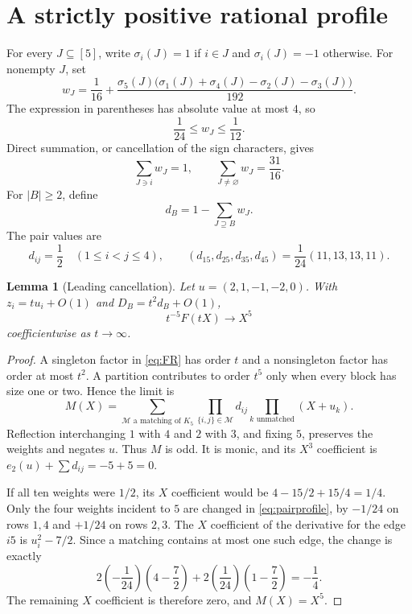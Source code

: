 \documentclass[11pt,a4paper]{article}
\newtheorem{lemma}[theorem]{Lemma}
\theoremstyle{definition}
\begin{document}
\section{A strictly positive rational profile}\label{sec:profile}

For every $J\subseteq[5]$, write $\sigma_i(J)=1$ if $i\in J$ and
$\sigma_i(J)=-1$ otherwise. For nonempty $J$, set
\begin{equation}\label{eq:weights}
 w_J=\frac1{16}
 +\frac{\sigma_5(J)\bigl(\sigma_1(J)+\sigma_4(J)
                         -\sigma_2(J)-\sigma_3(J)\bigr)}{192}.
\end{equation}
The expression in parentheses has absolute value at most $4$, so
\begin{equation}\label{eq:wpositive}
 \frac1{24}\le w_J\le\frac1{12}.
\end{equation}
Direct summation, or cancellation of the sign characters, gives
\begin{equation}\label{eq:wmoments}
 \sum_{J\ni i}w_J=1,\qquad
 \sum_{J\ne\varnothing}w_J=\frac{31}{16}.
\end{equation}
For $|B|\ge2$, define
\begin{equation}\label{eq:dprofile}
 d_B=1-\sum_{J\supseteq B}w_J.
\end{equation}
The pair values are
\begin{equation}\label{eq:pairprofile}
 d_{ij}=\frac12\quad(1\le i<j\le4),\qquad
 (d_{15},d_{25},d_{35},d_{45})
 =\frac1{24}(11,13,13,11).
\end{equation}

\begin{lemma}[Leading cancellation]\label{lem:leading}
Let $u=(2,1,-1,-2,0)$.
With $z_i=tu_i+O(1)$ and $D_B=t^2d_B+O(1)$,
\begin{equation}\label{eq:leading}
 t^{-5}F(tX)\longrightarrow X^5
\end{equation}
coefficientwise as $t\longrightarrow\infty$.
\end{lemma}
\begin{proof}
A singleton factor in \eqref{eq:FR} has order $t$ and a nonsingleton
factor has order at most $t^2$. A partition contributes to order $t^5$
only when every block has size one or two. Hence the limit is
\[
 M(X)=\sum_{\mathcal M\text{ a matching of }K_5}
       \prod_{\{i,j\}\in\mathcal M}d_{ij}
       \prod_{k\text{ unmatched}}(X+u_k).
\]
Reflection interchanging $1$ with $4$ and $2$ with $3$, and fixing $5$,
preserves the weights and negates $u$. Thus $M$ is odd.
It is monic, and its $X^3$ coefficient is
$e_2(u)+\sum d_{ij}=-5+5=0$.

If all ten weights were $1/2$, its $X$ coefficient would be
$4-15/2+15/4=1/4$.
Only the four weights incident to $5$ are changed in
\eqref{eq:pairprofile}, by $-1/24$ on rows $1,4$ and $+1/24$ on rows
$2,3$. The $X$ coefficient of the derivative for the edge $i5$ is
$u_i^2-7/2$. Since a matching contains at most one such edge, the change
is exactly
\[
 2\left(-\frac1{24}\right)\left(4-\frac72\right)
 +2\left(\frac1{24}\right)\left(1-\frac72\right)=-\frac14.
\]
The remaining $X$ coefficient is therefore zero, and $M(X)=X^5$.
\end{proof}
\end{document}
